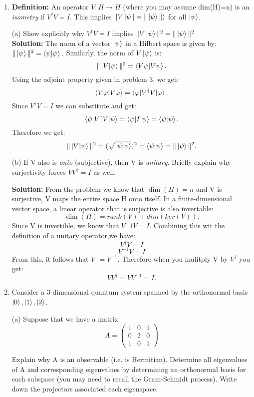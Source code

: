 \documentclass{article}
\renewcommand{\phi}{\varphi}
\theoremstyle{plain}
\numberwithin{thm}{section}
\theoremstyle{definition}
\begin{document}
\begin{enumerate}
    \item \textbf{Definition:} An operator $V: H \rightarrow H$ (where you may assume dim(H)=n) is an \textit{isometry} if $V^\dagger V=I$. This implies $\|V\ket{\psi\|=\|\ket{\psi}\|}$ for all $\ket{\psi}$.
    
    (a) Show explicitly why $V^\dagger V=I$ implies $\|V\ket{\psi}\|^2=\|\ket{\psi}\|^2$\\

    \textbf{Solution:} The norm of a vector $\ket{\psi}$ in a Hilbert space is given by: $\|\ket{\psi}\|^2=\braket{\psi|\psi}.$ Similarly, the norm of $V\ket{\psi}$ is: $$\|\ket{V|\psi}\|^2=\braket{V\psi|V\psi}.$$ Using the adjoint property given in problem 3, we get: $$\braket{V\phi|V\phi}=\braket{\phi|V^\dagger V|\phi}.$$ Since $V^\dagger V = I$ we can substitute and get: $$\braket{\psi|V^\dagger V|\psi}=\braket{\psi|I|\psi}=\braket{\psi|\psi}.$$ Therefore we get: $$\|\ket{V|\psi}\|^2=(\sqrt{\ket{\psi|\psi}})^2=\braket{\psi|\psi}=\|\ket{\psi}\|^2.$$
    
    (b) If V also is \textit{onto} (subjective), then V is \textit{unitary}. Briefly explain why surjectivity forces $VV^\dagger=I$ as well.

    \textbf{Solution:} From the problem we know that $\dim(H)=n$ and V is surjective, V maps the entire space H onto itself. In a finite-dimensional vector space, a linear operator that is surjective is also invertable: $$\dim(H)=rank(V)+dim(ker(V)).$$ Since V is invertible, we know that $V^-1 V =I.$ Combining this wit the definition of a unitary operator,we have: $$V^\dagger V = I$$ $$V^{-1}V = I$$ From this, it follows that $V^\dagger = V^{-1}.$ Therefore when you mulitply V by $V^\dagger$ you get: $$VV^\dagger=VV^{-1}=I.$$

    \item Consider a 3-dimensional quantum system spanned by the orthonormal basis{$\ket{0},\ket{1},\ket{2}$}.

    (a) Suppose that we have a matrix\\
    $$A = \begin{pmatrix}
    1 & 0 & 1 \\
    0 & 2 & 0 \\
    1 & 0 & 1
    \end{pmatrix}$$

    
    Explain why A is an observable (i.e. is Hermitian). Determine all eigenvalues of A and corresponding eigenvalues by determining an orthonormal basis for each subspace (you may need to recall the Gram-Schmidt process). Write down the projectors associated each eigenspace.


\end{enumerate}
\end{document}
